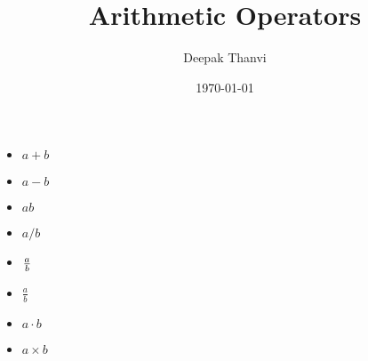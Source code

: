 \documentclass{article}
\title{Arithmetic Operators}
\author{Deepak Thanvi}
\date{\today}
\begin{document}
\maketitle
\begin{itemize}
	\item \(a+b\)
	\item \(a-b\)
	\item \(ab\)
	\item \(a / b\)
	\item \({a \over b}\)
	\item \( \frac{a}{b}\)
	\item \( a \cdot b\)
	\item \( a \times b \) 


\end{itemize}
\end{document}

